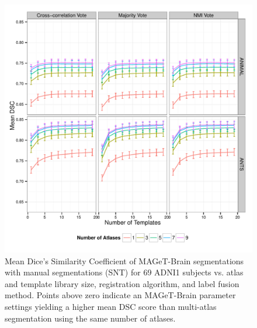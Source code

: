 \documentclass{article}\usepackage{graphicx, color}
\makeatletter
\def\maxwidth{ %
  \ifdim\Gin@nat@width>\linewidth
    \linewidth
  \else
    \Gin@nat@width
  \fi
}
\newenvironment{knitrout}{}{} %
\newcommand{\mb}{MAGeT-Brain }
\makeatother
\begin{document}
\begin{figure}
\begin{knitrout}
\color{fgcolor}

{\centering \includegraphics[width=\maxwidth]{figure/fig_ADNI1-xval-k-mean} 

}



\end{knitrout}

  \caption{Mean Dice's Similarity Coefficient of \mb segmentations with manual
  segmentations (SNT) for 69 ADNI1 subjects vs. atlas and template library size,
  registration algorithm, and label fusion method. Points above zero indicate an
  \mb parameter settings yielding a higher mean DSC score than multi-atlas
  segmentation using the same number of atlases. \label{fig:ADNI1-xval-k-mean}}
\end{figure}
\end{document}
